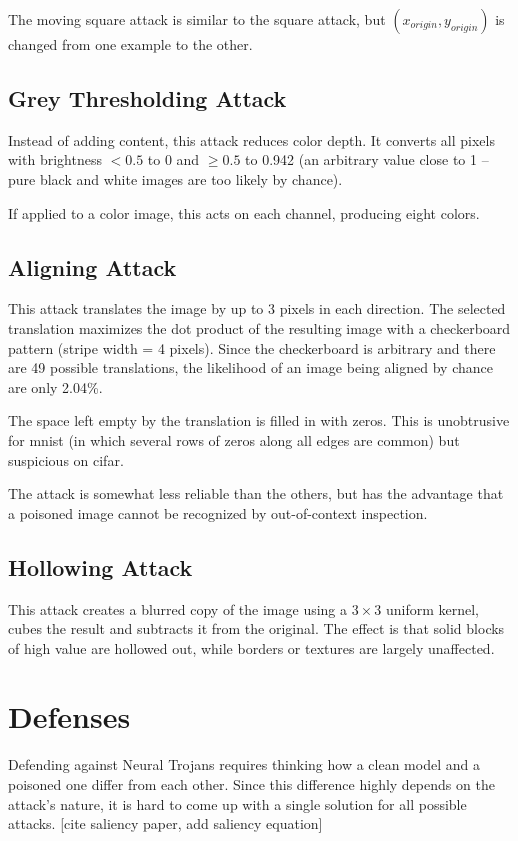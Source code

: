 \documentclass[letterpaper, 10 pt, conference]{ieeeconf}  %
\begin{document}
The moving square attack is similar to the square attack, but $(x_{origin}, y_{origin})$ is changed from one example to the other.


\subsection{Grey Thresholding Attack}


Instead of adding content, this attack reduces color depth.  It
converts all pixels with brightness $<0.5$ to 0 and $\geq 0.5$ to
0.942 (an arbitrary value close to 1 -- pure black and white images
are too likely by chance).

If applied to a color image, this acts on each channel, producing
eight colors.


\subsection{Aligning Attack}

This attack translates the image by up to 3 pixels in each direction.
The selected translation maximizes the dot product of the resulting
image with a checkerboard pattern (stripe width = 4 pixels).  Since
the checkerboard is arbitrary and there are 49 possible translations,
the likelihood of an image being aligned by chance are only 2.04\%.

The space left empty by the translation is filled in with zeros.  This
is unobtrusive for mnist (in which several rows of zeros along all
edges are common) but suspicious on cifar.

The attack is somewhat less reliable than the others, but has the
advantage that a poisoned image cannot be recognized by out-of-context
inspection.

\subsection{Hollowing Attack}

This attack creates a blurred copy of the image using a $3\times 3$
uniform kernel, cubes the result and subtracts it from the original.
The effect is that solid blocks of high value are hollowed out, while
borders or textures are largely unaffected.


\section{Defenses}

Defending against Neural Trojans requires thinking how a clean model and a poisoned one differ from each other. Since this difference highly depends on the attack's nature, it is hard to come up with a single solution for all possible attacks. [cite saliency paper, add saliency equation]
\end{document}
